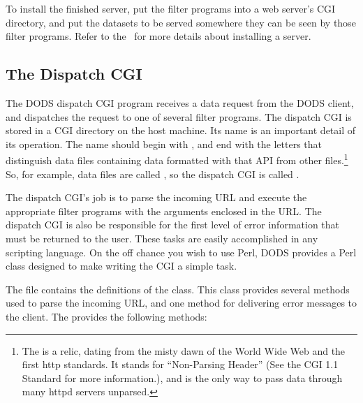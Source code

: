 To install the finished server, put the filter programs into a web
server's CGI directory, and put the datasets to be served somewhere
they can be seen by those filter programs.  Refer to the \OPDuser\
for more details about installing a server.

\subsection{The Dispatch CGI}
\label{tk,cgi}

The DODS dispatch CGI program receives a data request from the DODS
client, and dispatches the request to one of several filter programs.
The dispatch CGI is stored in a CGI directory on the host machine.
Its name is an important detail of its operation.  The name should
begin with \lit{nph-}, and end with the letters that distinguish data
files containing data formatted with that API from other
files.\footnote{The  is a relic, dating from the misty
  dawn of the World Wide Web and the first http standards.  It stands
  for ``Non-Parsing Header'' (See the CGI 1.1 Standard for more
  information.), and is the only way to pass data through many httpd
  servers unparsed.}  So,
for example, \netcdf data files are called , so the
\netcdf dispatch CGI is called \lit{nph-nc}.

The dispatch CGI's job is to parse the incoming URL and execute the
appropriate filter programs with the arguments enclosed in the URL.
The dispatch CGI is also be responsible for the first level of error
information that must be returned to the user.  These tasks are easily
accomplished in any scripting language.  On the off chance you wish to
use Perl, DODS provides a Perl class designed to make writing the CGI
a simple task.


The file  contains the definitions of the
\class{DODS\_Dispatch} class.  This class provides several methods
used to parse the incoming URL, and one method for delivering error
messages to the client.  The \class{DODS\_Dispatch} provides the
following methods:

